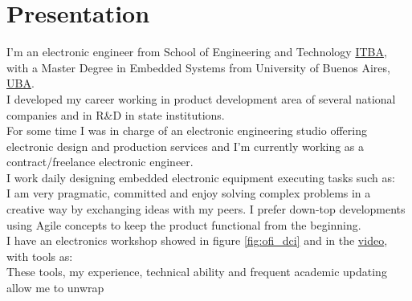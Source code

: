 \section{Presentation}

I'm an electronic engineer from School of Engineering and Technology \href{\linkitba}{ITBA},
with a Master Degree in Embedded Systems from University of Buenos Aires, \href{\linkuba}{UBA}.\\
I developed my career working in product development area of several
national companies and in R\&D in state institutions.\\
For some time I was in charge of an electronic engineering studio offering electronic design
and production services and I'm currently working as a contract/freelance electronic engineer.\\ %
I work daily designing embedded electronic equipment executing tasks such as: \\
I am very pragmatic, committed and enjoy solving complex problems in a creative way by exchanging ideas
with my peers. I prefer down-top developments using Agile concepts to keep the product functional from
the beginning.\\
I have an electronics workshop showed in figure \ref{fig:ofi_dci} and in the \href{\linkofidcitwentyone}{video}, with tools as:\\
These tools, my experience, technical ability and frequent academic updating allow me to unwrap
